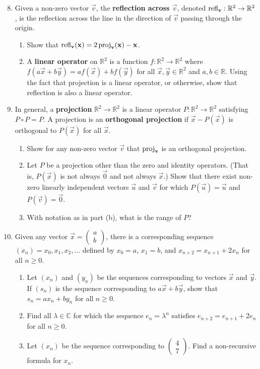 \begin{enumerate}\setcounter{enumi}{7}
\item Given a non-zero vector $\vec{v}$, the \textbf{reflection across $\vec{v}$}, denoted $\operatorname{refl}_{\mathbf{v}}:\mathbb{R}^2\to\mathbb{R}^2$, is the reflection across the line in the direction of $\vec{v}$ passing through the origin.
\begin{enumerate}
\item Show that $\operatorname{refl}_{\mathbf{v}}(\mathbf{x}) = 2\operatorname{proj}_{\mathbf{v}}(\mathbf{x}) - \mathbf{x}$.
\item A \textbf{linear operator} on $\mathbb{R}^2$ is a function $f:\mathbb{R}^2\to\mathbb{R}^2$ where $f(a\vec{x} + b\vec{y}) = af(\vec{x}) + bf(\vec{y})$ for all $\vec{x},\vec{y}\in\mathbb{R}^2$ and $a,b\in\mathbb{R}$. Using the fact that projection is a linear operator, or otherwise, show that reflection is also a linear operator.
\end{enumerate}
\item In general, a \textbf{projection} $\mathbb{R}^2\to\mathbb{R}^2$ is a linear operator $P:\mathbb{R}^2\to\mathbb{R}^2$ satisfying $P\circ P = P$. A projection is an \textbf{orthogonal projection} if $\vec{x} - P(\vec{x})$ is orthogonal to $P(\vec{x})$ for all $\vec{x}$.
\begin{enumerate}
\item Show for any non-zero vector $\vec{v}$ that $\operatorname{proj}_{\mathbf{v}}$ is an orthogonal projection.
\item Let $P$ be a projection other than the zero and identity operators. (That is, $P(\vec{x})$ is not always $\vec{0}$ and not always $\vec{x}$.) Show that there exist non-zero linearly independent vectors $\vec{u}$ and $\vec{v}$ for which $P(\vec{u}) = \vec{u}$ and $P(\vec{v}) = \vec{0}$.
\item With notation as in part (b), what is the range of $P$?
\end{enumerate}
\item Given any vector $\vec{x} = \begin{pmatrix} a \\ b \end{pmatrix}$, there is a corresponding sequence $(x_n) = x_0, x_1, x_2, \ldots$ defined by $x_0 = a$, $x_1 = b$, and $x_{n + 2} = x_{n + 1} + 2x_n$ for all $n\geq 0$.
\begin{enumerate}
\item Let $(x_n)$ and $(y_n)$ be the sequences corresponding to vectors $\vec{x}$ and $\vec{y}$. If $(s_n)$ is the sequence corresponding to $a\vec{x} + b\vec{y}$, show that $s_n = ax_n + by_n$ for all $n\geq 0$.
\item Find all $\lambda\in\mathbb{C}$ for which the sequence $e_n = \lambda^n$ satisfies $e_{n + 2} = e_{n + 1} + 2e_n$ for all $n\geq 0$.
\item Let $(x_n)$ be the sequence corresponding to $\begin{pmatrix} 4 \\ 7 \end{pmatrix}$. Find a non-recursive formula for $x_n$.
\end{enumerate}
\end{enumerate}


